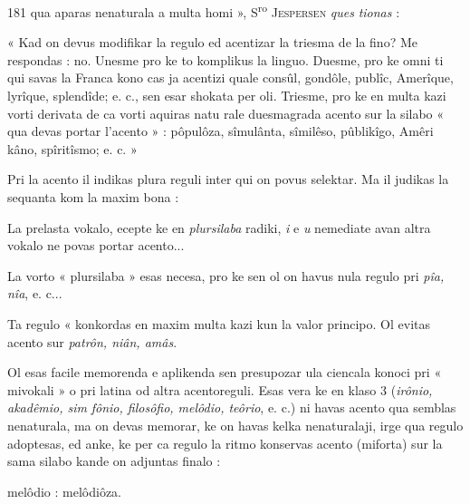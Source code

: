 \begin{VUpage}[185]{181}
\VUcontinue
qua aparas nenaturala a multa homi », S\textsuperscript{ro} \textsc{Jespersen} \textit{ques}\cc
\textit{tionas} :

« Kad on devus modifikar la regulo ed acentizar la triesma\nl
de la fino? Me respondas : no. Unesme pro ke to komplikus\nl
la linguo. Duesme, pro ke omni ti qui savas la Franca kono\cc
cas ja acentizi quale consûl, gondôle, publîc, Amerîque,\nl
lyrîque, splendîde; e. c., sen esar shokata per oli. Triesme,\nl
pro ke en multa kazi vorti derivata de ca vorti aquiras natu\cc
rale duesmagrada acento sur la silabo « qua devas portar\nl
l'acento » : pôpulôza, sîmulânta, sîmilêso, pûblikîgo, Amêri\cc
kâno, spîritîsmo; e. c. »

Pri la acento il indikas plura reguli inter qui on povus\nl
selektar. Ma il judikas la sequanta kom la maxim bona :

La prelasta vokalo, ecepte ke en \textit{plursilaba} radiki, \textit{i} e \textit{u}\nl
nemediate avan altra vokalo ne povas portar acento...

La vorto « plursilaba » esas necesa, pro ke sen ol on\nl
havus nula regulo pri \textit{pîa, nîa}, e. c...

Ta regulo « konkordas en maxim multa kazi kun la valor\cc
principo. Ol evitas acento sur \textit{patrôn, niân, amâs}.

Ol esas facile memorenda e aplikenda sen presupozar ula\nl
ciencala konoci pri « mivokali » o pri latina od altra\nl
acentoreguli. Esas vera ke en klaso 3 (\textit{irônio, akadêmio, sim}\cc
\textit{fônio, filosôfio, melôdio, teôrio}, e. c.) ni havas acento qua\nl
semblas nenaturala, ma on devas memorar, ke on havas\nl
kelka nenaturalaji, irge qua regulo adoptesas, ed anke, ke\nl
per ca regulo la ritmo konservas acento (miforta) sur la\nl
sama silabo kande on adjuntas finalo :

melôdio : melôdiôza.


\end{VUpage}
